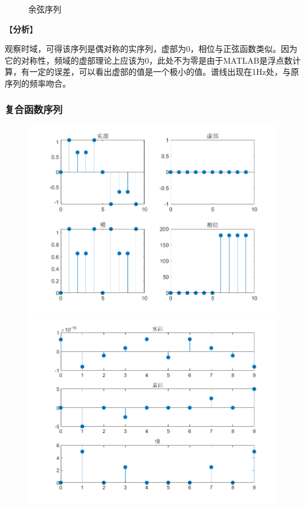 \documentclass{../source/zjureport}
\begin{document}
\begin{figure}[H]
\begin{minipage}[t]{0.48\textwidth}
                    \end{minipage}
                    \caption{余弦序列}
                \end{figure}

                【\textbf{分析}】

                观察时域，可得该序列是偶对称的实序列，虚部为0，相位与正弦函数类似。因为它的对称性，频域的虚部理论上应该为0，此处不为零是由于MATLAB是浮点数计算，有一定的误差，可以看出虚部的值是一个极小的值。谱线出现在1Hz处，与原序列的频率吻合。



            \subsubsection{复合函数序列}
                \begin{figure}[H]
                    \centering
                    \begin{minipage}[t]{0.48\textwidth}
                    \centering
                    \includegraphics[width=\textwidth]{figure/复合函数序列_phi=0.png}
                    \end{minipage}
                    \begin{minipage}[t]{0.48\textwidth}
                    \centering
                    \includegraphics[width=\textwidth]{figure/频谱_复合函数序列_phi=0.png}

\end{minipage}
\end{figure}
\end{document}
